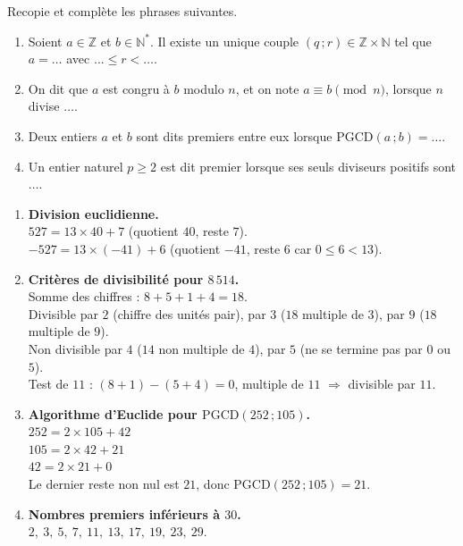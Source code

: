 \documentclass[11pt]{article}
\begin{document}
\begin{exercice}
Recopie et complète les phrases suivantes.
\begin{enumerate}
\item Soient $a \in \mathbb{Z}$ et $b \in \mathbb{N}^*$. Il existe un unique couple $(q\,;r) \in \mathbb{Z} \times \mathbb{N}$ tel que $a = \ldots$ avec $\ldots \leq r < \ldots$.
\item On dit que $a$ est congru à $b$ modulo $n$, et on note $a \equiv b \pmod{n}$, lorsque $n$ divise $\ldots$.
\item Deux entiers $a$ et $b$ sont dits premiers entre eux lorsque $\mathrm{PGCD}(a\,;b) = \ldots$.
\item Un entier naturel $p \geq 2$ est dit premier lorsque ses seuls diviseurs positifs sont $\ldots$.
\end{enumerate}
\end{exercice}

\begin{exoresolu}
\begin{enumerate}
\item \textbf{Division euclidienne.} \\
$527 = 13 \times 40 + 7$ \quad (quotient $40$, reste $7$). \\
$-527 = 13 \times (-41) + 6$ \quad (quotient $-41$, reste $6$ car $0 \le 6 < 13$).
\item \textbf{Critères de divisibilité pour $8\,514$.} \\
Somme des chiffres : $8+5+1+4 = 18$. \\
Divisible par $2$ (chiffre des unités pair), par $3$ ($18$ multiple de $3$), par $9$ ($18$ multiple de $9$). \\
Non divisible par $4$ ($14$ non multiple de $4$), par $5$ (ne se termine pas par $0$ ou $5$). \\
Test de $11$ : $(8+1) - (5+4) = 0$, multiple de $11$ $\Rightarrow$ divisible par $11$.
\item \textbf{Algorithme d'Euclide pour $\mathrm{PGCD}(252\,;105)$.} \\
$252 = 2 \times 105 + 42$ \\
$105 = 2 \times 42 + 21$ \\
$42 = 2 \times 21 + 0$ \\
Le dernier reste non nul est $21$, donc $\mathrm{PGCD}(252\,;105) = 21$.
\item \textbf{Nombres premiers inférieurs à $30$.} \\
$2,\ 3,\ 5,\ 7,\ 11,\ 13,\ 17,\ 19,\ 23,\ 29$.
\end{enumerate}
\end{exoresolu}
\end{document}
